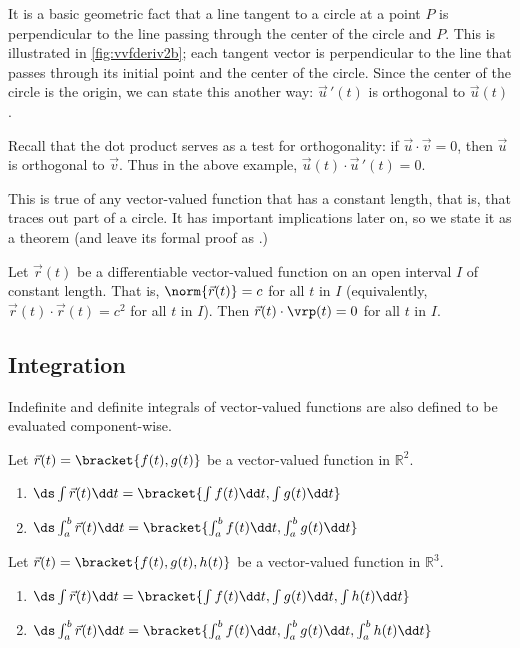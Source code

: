 It is a basic geometric fact that a line tangent to a circle at a point $P$ is perpendicular to the line passing through the center of the circle and $P$. This is illustrated in \autoref{fig:vvfderiv2b}; each tangent vector is perpendicular to the line that passes through its initial point and the center of the circle. Since the center of the circle is the origin, we can state this another way: $\vec u\,'(t)$ is orthogonal to $\vec u(t)$.

Recall that the dot product serves as a test for orthogonality: if $\vec u\cdot \vec v = 0$, then $\vec u$ is orthogonal to $\vec v$. Thus in the above example, $\vec u(t)\cdot \vec u\,'(t)=0$.

This is true of any vector-valued function that has a constant length, that is, that traces out part of a circle. It has important implications later on, so we state it as a theorem (and leave its formal proof as .)

\begin{theorem}\label{thm:vects_of_constant_length}
Let $\vec r(t)$ be a differentiable vector-valued function on an open interval $I$ of constant length. That is, $\norm{\vec r(t)} = c$ for all $t$ in $I$ (equivalently, $\vec r(t)\cdot \vec r(t) = c^2$ for all $t$ in $I$). 
Then $\vec r(t)\cdot\vrp(t) = 0$ for all $t$ in $I$.
\end{theorem}

\subsection{Integration}

Indefinite and definite integrals of vector-valued functions are also defined to be evaluated component-wise.

\begin{definition}\label{thm:vvf_integration}
Let $\vec r(t) =\bracket{f(t),g(t)}$ be a vector-valued function in $\mathbb{R}^2$.
\begin{enumerate}
	\item $\ds \int \vec r(t)\dd t =\bracket{\int f(t)\dd t, \int g(t)\dd t}$
	\item	$\ds \int_a^b \vec r(t)\dd t =\bracket{\int_a^b f(t)\dd t, \int_a^b g(t)\dd t}$
\end{enumerate}
Let $\vec r(t) =\bracket{f(t),g(t),h(t)}$ be a vector-valued function in $\mathbb{R}^3$.
\begin{enumerate}
	\item $\ds \int \vec r(t)\dd t =\bracket{\int f(t)\dd t, \int g(t)\dd t, \int h(t)\dd t}$
	\item	$\ds \int_a^b \vec r(t)\dd t =\bracket{\int_a^b f(t)\dd t, \int_a^b g(t)\dd t, \int_a^b h(t)\dd t}$
\end{enumerate}
\end{definition}

